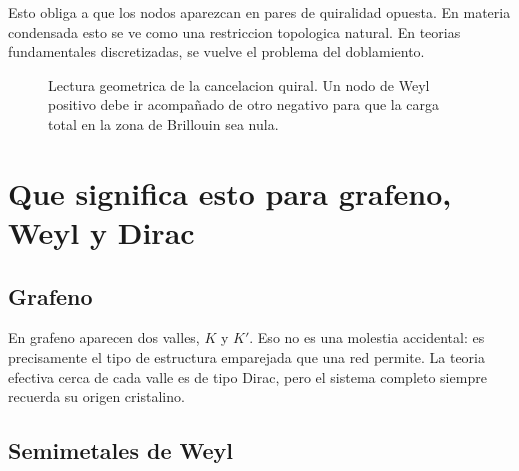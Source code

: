 Esto obliga a que los nodos aparezcan en pares de quiralidad opuesta. En materia condensada esto se ve como una restriccion topologica natural. En teorias fundamentales discretizadas, se vuelve el problema del doblamiento.

\begin{figure}[ht]
\centering
{}
\caption{Lectura geometrica de la cancelacion quiral. Un nodo de Weyl positivo debe ir acompa\~nado de otro negativo para que la carga total en la zona de Brillouin sea nula.}
\label{c26:fig:chirality-pair}
\end{figure}

\section{Que significa esto para grafeno, Weyl y Dirac}

\subsection{Grafeno}

En grafeno aparecen dos valles, \(K\) y \(K'\). Eso no es una molestia accidental: es precisamente el tipo de estructura emparejada que una red permite. La teoria efectiva cerca de cada valle es de tipo Dirac, pero el sistema completo siempre recuerda su origen cristalino.

\subsection{Semimetales de Weyl}

